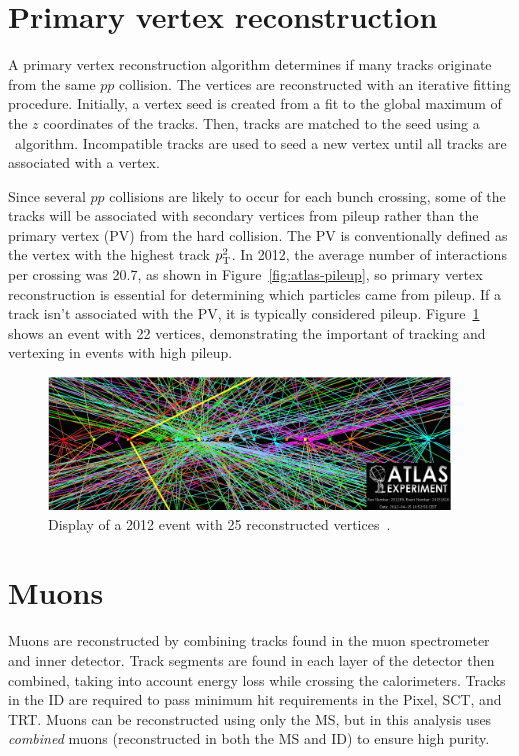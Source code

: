 \section{Primary vertex reconstruction}
A primary vertex reconstruction algorithm determines if many tracks originate from the same $pp$ collision\cite{ATLAS-CONF-2010-069,ATLAS-CONF-2012-042}. The vertices are reconstructed with an iterative fitting procedure. Initially, a vertex seed is created from a fit to the global maximum of the $z$ coordinates of the tracks. Then, tracks are matched to the seed using a \chisq\ algorithm. Incompatible tracks are used to seed a new vertex until all tracks are associated with a vertex.

Since several $pp$ collisions are likely to occur for each bunch crossing, some of the tracks will be associated with secondary vertices from pileup rather than the primary vertex (PV) from the hard collision. The PV is conventionally defined as the vertex with the highest track $p_{\text{T}}^2$. In 2012, the average number of interactions per crossing was 20.7, as shown in Figure~\ref{fig:atlas-pileup}, so primary vertex reconstruction is essential for determining which particles came from pileup. If a track isn't associated with the PV, it is typically considered pileup. Figure~\ref{fig:disppileup} shows an event with 22 vertices, demonstrating the important of tracking and vertexing in events with high pileup.


\begin{figure}[tp]
  \centering
  \includegraphics[width=0.95\textwidth]{fig/atlas/pileupEvent}
  \caption{Display of a 2012 event with 25 reconstructed vertices~\cite{eventdisp}.}
  \label{fig:disppileup}
\end{figure}

\section{Muons}
Muons are reconstructed by combining tracks found in the muon spectrometer and inner detector. Track segments are found in each layer of the detector then combined, taking into account energy loss while crossing the calorimeters. Tracks in the ID are required to pass minimum hit requirements in the Pixel, SCT, and TRT. Muons can be reconstructed using only the MS, but in this analysis uses \emph{combined} muons (reconstructed in both the MS and ID) to ensure high purity.

